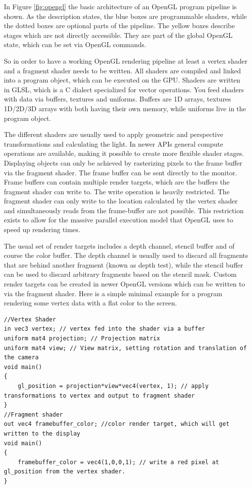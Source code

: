 In Figure \ref{fig:opengl} the basic architecture of an OpenGL program pipeline is shown.
As the description states, the blue boxes are programmable shaders, while the dotted boxes are optional parts of the pipeline.
The yellow boxes describe stages which are not directly accessible. They are part of the global OpenGL state, which can be set via OpenGL commands.

So in order to have a working OpenGL rendering pipeline at least a vertex shader and a fragment shader needs to be written.
All shaders are compiled and linked into a program object, which can be executed on the \ac{GPU}.
Shaders are written in \ac{GLSL}, which is a C dialect specialized for vector operations.
You feed shaders with data via buffers, textures and uniforms. Buffers are 1D arrays, textures 1D/2D/3D arrays with both having their own memory, while uniforms live in the program object.

The different shaders are usually used to apply geometric and perspective transformations and calculating the light.
In newer APIs general compute operations are available, making it possible to create more flexible shader stages.
Displaying objects can only be achieved by rasterizing pixels to the frame buffer via the fragment shader.
The frame buffer can be sent directly to the monitor.
Frame buffers can contain multiple render targets, which are the buffers the fragment shader can write to.
The write operation is heavily restricted. The fragment shader can only write to the location calculated by the vertex shader and simultaneously reads from the frame-buffer are not possible. 
This restriction exists to allow for the massive parallel execution model that OpenGL uses to speed up rendering times.

The usual set of render targets includes a depth channel, stencil buffer and of course the color buffer.
The depth channel is usually used to discard all fragments that are behind another fragment (known as depth test), while the stencil buffer can be used to discard arbitrary fragments based on the stencil mask. 
Custom render targets can be created in newer OpenGL versions which can be written to via the fragment shader.
Here is a simple minimal example for a program rendering some vertex data with a flat color to the screen.

\begin{lstlisting}
//Vertex Shader
in vec3 vertex; // vertex fed into the shader via a buffer
uniform mat4 projection; // Projection matrix
uniform mat4 view; // View matrix, setting rotation and translation of the camera
void main()
{
    gl_position = projection*view*vec4(vertex, 1); // apply transformations to vertex and output to fragment shader
}
//Fragment shader
out vec4 framebuffer_color; //color render target, which will get written to the display
void main()
{
    framebuffer_color = vec4(1,0,0,1); // write a red pixel at gl_position from the vertex shader.
}
\end{lstlisting}

